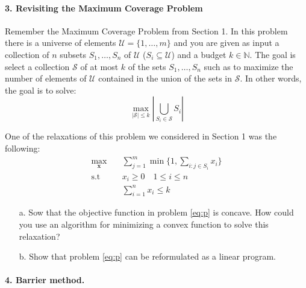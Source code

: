 \documentclass[11pt]{article}
\theoremstyle{remark}
\newcommand{\N}{\mathbb{N}}                     %
\newcommand{\bx}{\mathbf{x}}
\begin{document}
\paragraph{3. Revisiting the Maximum Coverage Problem}

Remember the Maximum Coverage Problem from Section 1. In this problem there is
a universe of elements $\mathcal{U} = \{1,\dots,m\}$ and you are given as input
a collection of $n$ subsets $S_1,\dots, S_n$ of $\mathcal{U}$ ($S_i\subseteq
\mathcal{U}$) and a budget $k\in\N$. The goal is select a collection
$\mathcal{S}$ of at most $k$ of the sets $S_1,\dots,S_n$ such as to maximize
the number of elements of $\mathcal{U}$ contained in the union of the sets in
$\mathcal{S}$. In other words, the goal is to solve:
\begin{displaymath}
    \max_{|\mathcal{S}|\leq k}\left|\bigcup_{S_i\in\mathcal{S}} S_i\right|
\end{displaymath}

One of the relaxations of this problem we considered in Section 1 was the
following:
    \begin{equation}
        \tag{P}
        \label{eq:p}
        \begin{aligned}
            \max_{\bx} &\quad \sum_{j=1}^m \min\Bigg\{1,\sum_{i:j\in S_i} x_i\Bigg\}\\
            \text{s.t} &\quad x_i\geq 0\quad 1\leq i\leq n\\
                       &\quad \sum_{i=1}^n x_i\leq k
        \end{aligned}
    \end{equation}

\begin{itemize}
    \item[a.]  Sow that the objective function in problem \eqref{eq:p} is
        concave. How could you use an algorithm for minimizing a convex
        function to solve this relaxation?
    \item[b.] Show that problem \eqref{eq:p} can be reformulated as a linear
        program.
\end{itemize}


\paragraph{4. Barrier method.}
\end{document}
